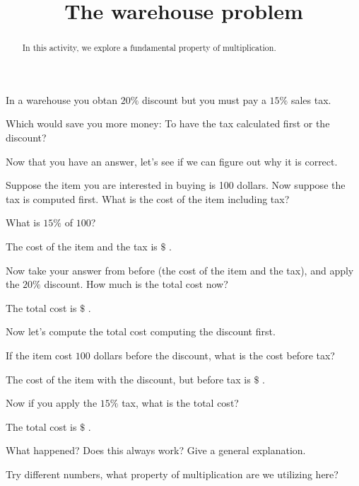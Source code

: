 \documentclass[handout]{ximera}
\title{The warehouse problem}
\begin{document}
\begin{abstract}
In this activity, we explore a fundamental property of multiplication. 
\end{abstract}
\maketitle

In a warehouse you obtan $20\%$ discount but you must pay a $15\%$
sales tax.

\begin{question}
Which would save you more money: To have the tax calculated first or
the discount?
\begin{solution}
\begin{multiple-choice}
\end{multiple-choice}
\end{solution}
\end{question}

Now that you have an answer, let's see if we can figure out why it is
correct. 

\begin{question}
Suppose the item you are interested in buying is 100
dollars. Now suppose the tax is computed first. What is the cost of
the item including tax?
\begin{solution}
\begin{hint}
What is $15\%$ of $100$?  
\end{hint}
The cost of the item and the tax is
$\$ $ .
\end{solution}
 Now take your answer from before (the cost of the item and the tax),
and apply the $20\%$ discount. How much is the total cost now?
\begin{solution}
The total cost is $\$ $ . 
\end{solution}
\end{question}

Now let's compute the total cost computing the discount first. 

\begin{question}
If the item cost $100$ dollars before the discount, what is the cost
before tax?
\begin{solution}
The cost of the item with the discount, but before tax is $\$ $ . 
\end{solution}
 Now if you apply the $15\%$ tax, what is the total cost?
\begin{solution}
The total cost is $\$ $ .
\end{solution} 
\end{question}

\begin{exploration}
What happened? Does this always work? Give a general explanation.
\begin{free-response}
Try different numbers, what property of multiplication are we
utilizing here?
\end{free-response}
\end{exploration}
\end{document}
